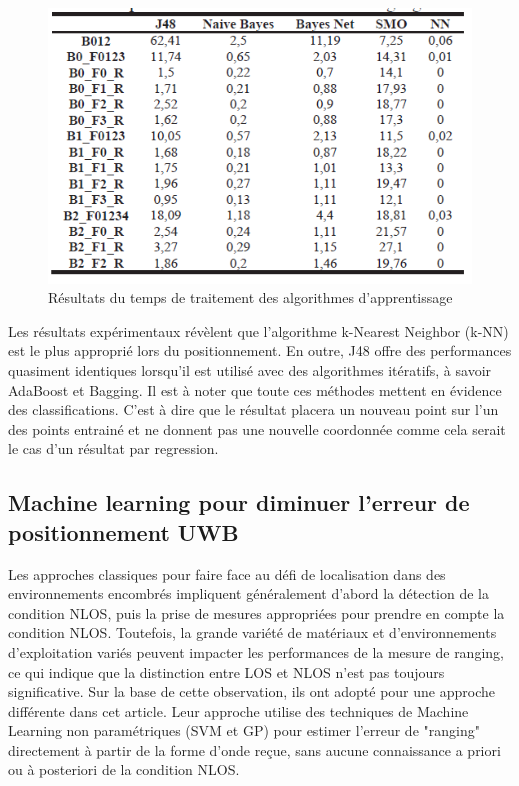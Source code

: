 \begin{figure}[htp]
	\begin{center}
		\includegraphics[scale=1]{figures/time.png}
		\caption{Résultats du temps de traitement des algorithmes d'apprentissage\cite{ML_algo}}
		\label{fig:time} %
	\end{center}
\end{figure}

Les résultats expérimentaux révèlent que l’algorithme k-Nearest Neighbor (k-NN) est le plus approprié lors du positionnement. En outre, J48 offre des performances quasiment identiques lorsqu'il est utilisé avec des algorithmes itératifs, à savoir AdaBoost et Bagging. Il est à noter que toute ces méthodes mettent en évidence des classifications. C'est à dire que le résultat placera un nouveau point sur l'un des points entrainé et ne donnent pas une nouvelle coordonnée comme cela serait le cas d'un résultat par regression. 

\subsection{Machine learning pour diminuer l'erreur de positionnement UWB \cite{ML_UWB}}
Les approches classiques pour faire face au défi de localisation dans des environnements encombrés impliquent généralement d'abord la détection de la condition NLOS, puis la prise de mesures appropriées pour prendre en compte la condition NLOS. Toutefois, la grande variété de matériaux et d’environnements d’exploitation variés peuvent impacter les performances de la mesure de ranging, ce qui indique que la distinction entre LOS et NLOS n’est pas toujours significative. Sur la base de cette observation, ils ont adopté pour une approche différente dans cet article. Leur approche utilise des techniques de Machine Learning non paramétriques (SVM et GP) pour estimer l’erreur de "ranging" directement à partir de la forme d’onde reçue, sans aucune connaissance a priori ou à posteriori de la condition NLOS. 

